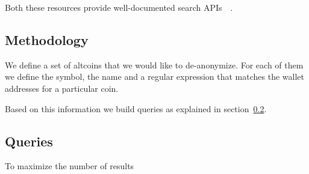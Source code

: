 Both these resources provide well-documented search APIs~\cite{}~\cite{}.

\subsection{Methodology}
\label{sec:methodology}
We define a set of altcoins that we would like to de-anonymize. For each of them we define the symbol, the name and a regular expression
that matches the wallet addresses for a particular coin.

Based on this information we build queries as explained in section~\ref{sec:queries}.

\subsection{Queries} 
\label{sec:queries}

To maximize the number of results


